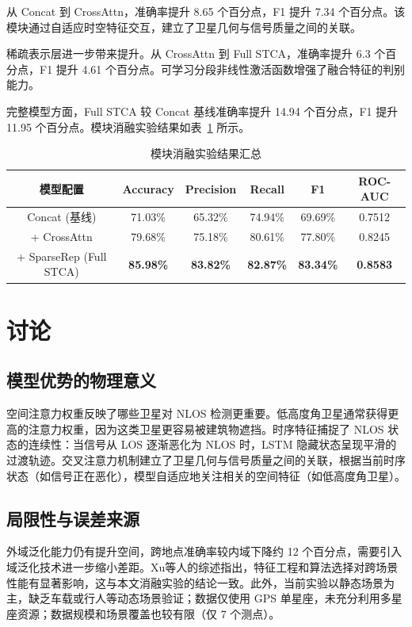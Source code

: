 从 Concat 到 CrossAttn，准确率提升 8.65 个百分点，F1 提升 7.34 个百分点。该模块通过自适应时空特征交互，建立了卫星几何与信号质量之间的关联。

稀疏表示层进一步带来提升。从 CrossAttn 到 Full STCA，准确率提升 6.3 个百分点，F1 提升 4.61 个百分点。可学习分段非线性激活函数增强了融合特征的判别能力。

完整模型方面，Full STCA 较 Concat 基线准确率提升 14.94 个百分点，F1 提升 11.95 个百分点。模块消融实验结果如表~\ref{tab:module_ablation} 所示。

\begin{table}[htbp]
\centering
\caption{模块消融实验结果汇总}
\label{tab:module_ablation}
\begin{tabular}{cccccc}
\toprule
模型配置 & Accuracy & Precision & Recall & F1 & ROC-AUC \\
\midrule
Concat (基线) & 71.03\% & 65.32\% & 74.94\% & 69.69\% & 0.7512 \\
+ CrossAttn & 79.68\% & 75.18\% & 80.61\% & 77.80\% & 0.8245 \\
+ SparseRep (Full STCA) & \textbf{85.98\%} & \textbf{83.82\%} & \textbf{82.87\%} & \textbf{83.34\%} & \textbf{0.8583} \\
\bottomrule
\end{tabular}
\end{table}

\section{讨论}

\subsection{模型优势的物理意义}

空间注意力权重反映了哪些卫星对 NLOS 检测更重要。低高度角卫星通常获得更高的注意力权重，因为这类卫星更容易被建筑物遮挡。时序特征捕捉了 NLOS 状态的连续性：当信号从 LOS 逐渐恶化为 NLOS 时，LSTM 隐藏状态呈现平滑的过渡轨迹。交叉注意力机制建立了卫星几何与信号质量之间的关联，根据当前时序状态（如信号正在恶化），模型自适应地关注相关的空间特征（如低高度角卫星）。

\subsection{局限性与误差来源}

外域泛化能力仍有提升空间，跨地点准确率较内域下降约 12 个百分点，需要引入域泛化技术进一步缩小差距。Xu等人\cite{xu2024ml_gnss}的综述指出，特征工程和算法选择对跨场景性能有显著影响，这与本文消融实验的结论一致。此外，当前实验以静态场景为主，缺乏车载或行人等动态场景验证；数据仅使用 GPS 单星座，未充分利用多星座资源；数据规模和场景覆盖也较有限（仅 7 个测点）。

